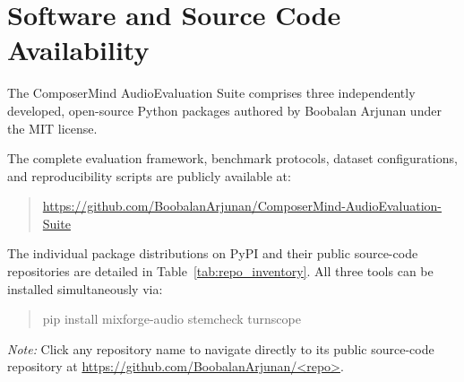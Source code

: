 \documentclass[10pt,journal,compsoc]{IEEEtran}
\begin{document}
\section{Software and Source Code Availability}
The ComposerMind AudioEvaluation Suite comprises three independently developed, open-source Python packages authored by Boobalan Arjunan under the MIT license.

The complete evaluation framework, benchmark protocols, dataset configurations, and reproducibility scripts are publicly available at:
\begin{quote}
\centering
\url{https://github.com/BoobalanArjunan/ComposerMind-AudioEvaluation-Suite}
\end{quote}

The individual package distributions on PyPI and their public source-code repositories are detailed in Table~\ref{tab:repo_inventory}. All three tools can be installed simultaneously via:
\begin{quote}
\footnotesize\ttfamily
pip install mixforge-audio stemcheck turnscope
\end{quote}

\begin{table}[t]
\centering
\caption{Public PyPI Distributions and GitHub Source Repositories.}
\label{tab:repo_inventory}
\footnotesize
\renewcommand{\arraystretch}{1.18}
\vspace{1mm}
\begin{minipage}{\columnwidth}
\scriptsize \textit{Note:} Click any repository name to navigate directly to its public source-code repository at \url{https://github.com/BoobalanArjunan/<repo>}.
\end{minipage}
\end{table}
\end{document}
